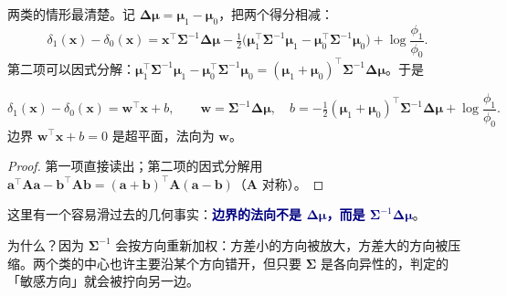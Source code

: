 \documentclass[11pt,a4paper,fontset=windows,zihao=-4]{ctexart}
\newcommand{\bw}{\mathbf{w}}
\newcommand{\bx}{\mathbf{x}}
\newcommand{\ba}{\mathbf{a}}
\newcommand{\bb}{\mathbf{b}}
\newcommand{\bA}{\mathbf{A}}
\newcommand{\bSigma}{\boldsymbol{\Sigma}}
\newcommand{\bmu}{\boldsymbol{\mu}}
\newcommand{\bDelta}{\boldsymbol{\Delta}}
\newcommand{\tp}{^{\top}}
\newcommand{\hl}[1]{\textcolor{navy}{\textbf{#1}}}
\begin{document}
两类的情形最清楚。记 $\bDelta\bmu=\bmu_1-\bmu_0$，把两个得分相减：
\begin{equation}
  \delta_1(\bx)-\delta_0(\bx)
  =\bx\tp\bSigma^{-1}\bDelta\bmu
  -\tfrac12\bigl(\bmu_1\tp\bSigma^{-1}\bmu_1-\bmu_0\tp\bSigma^{-1}\bmu_0\bigr)
  +\log\frac{\phi_1}{\phi_0}.
  \label{eq:diff}
\end{equation}
第二项可以因式分解：$\bmu_1\tp\bSigma^{-1}\bmu_1-\bmu_0\tp\bSigma^{-1}\bmu_0=(\bmu_1+\bmu_0)\tp\bSigma^{-1}\bDelta\bmu$。于是

\begin{prop}[线性边界]
\begin{equation}
  \delta_1(\bx)-\delta_0(\bx)=\bw\tp\bx+b,
  \qquad
  \bw=\bSigma^{-1}\bDelta\bmu,\quad
  b=-\tfrac12(\bmu_1+\bmu_0)\tp\bSigma^{-1}\bDelta\bmu+\log\frac{\phi_1}{\phi_0}.
  \label{eq:wb}
\end{equation}
边界 $\bw\tp\bx+b=0$ 是超平面，法向为 $\bw$。
\end{prop}

\begin{proof}
第一项直接读出；第二项的因式分解用 $\ba\tp\bA\ba-\bb\tp\bA\bb=(\ba+\bb)\tp\bA(\ba-\bb)$（$\bA$ 对称）。
\end{proof}

这里有一个容易滑过去的几何事实：\hl{边界的法向不是 $\bDelta\bmu$，而是 $\bSigma^{-1}\bDelta\bmu$}。

为什么？因为 $\bSigma^{-1}$ 会按方向重新加权：方差小的方向被放大，方差大的方向被压缩。两个类的中心也许主要沿某个方向错开，但只要 $\bSigma$ 是各向异性的，判定的「敏感方向」就会被拧向另一边。
\end{document}
